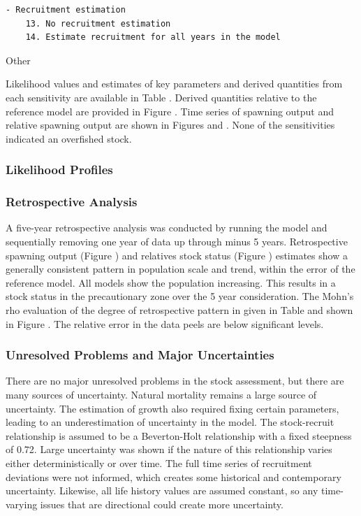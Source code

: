 \documentclass[
]{scrartcl}
\begin{document}
\begin{verbatim}
- Recruitment estimation
    13. No recruitment estimation
    14. Estimate recruitment for all years in the model
\end{verbatim}

Other

Likelihood values and estimates of key parameters and derived quantities
from each sensitivity are available in Table . Derived quantities
relative to the reference model are provided in Figure . Time series of
spawning output and relative spawning output are shown in Figures and .
None of the sensitivities indicated an overfished stock.

\subsubsection{Likelihood Profiles}\label{likelihood-profiles}

\subsubsection{Retrospective Analysis}\label{retrospective-analysis}

A five-year retrospective analysis was conducted by running the model
and sequentially removing one year of data up through minus 5 years.
Retrospective spawning output (Figure ) and relatives stock status
(Figure ) estimates show a generally consistent pattern in population
scale and trend, within the error of the reference model. All models
show the population increasing. This results in a stock status in the
precautionary zone over the 5 year consideration. The Mohn's rho
evaluation of the degree of retrospective pattern in given in Table and
shown in Figure . The relative error in the data peels are below
significant levels.

\subsubsection{Unresolved Problems and Major
Uncertainties}\label{unresolved-problems-and-major-uncertainties-1}

There are no major unresolved problems in the stock assessment, but
there are many sources of uncertainty. Natural mortality remains a large
source of uncertainty. The estimation of growth also required fixing
certain parameters, leading to an underestimation of uncertainty in the
model. The stock-recruit relationship is assumed to be a Beverton-Holt
relationship with a fixed steepness of 0.72. Large uncertainty was shown
if the nature of this relationship varies either deterministically or
over time. The full time series of recruitment deviations were not
informed, which creates some historical and contemporary uncertainty.
Likewise, all life history values are assumed constant, so any
time-varying issues that are directional could create more uncertainty.
\end{document}
